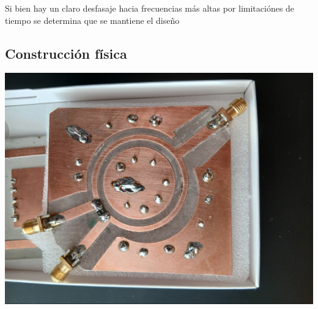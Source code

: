 \documentclass[a4paper, 12pt]{article}
\begin{document}
Si bien hay un claro desfasaje hacia frecuencias más altas por limitaciónes de tiempo se determina que se mantiene el diseño

\subsection{Construcción física}

\includegraphics[width=0.7\linewidth]{./img/real.jpg}
\end{document}
